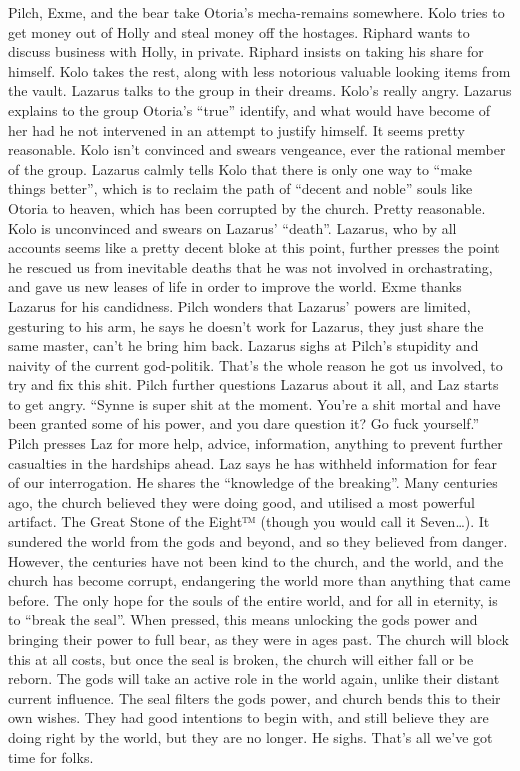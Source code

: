 Pilch, Exme, and the bear take Otoria’s mecha-remains somewhere.\medskip
Kolo tries to get money out of Holly and steal money off the hostages. Riphard wants to discuss business with Holly, in private. Riphard insists on taking his share for himself. Kolo takes the rest, along with less notorious valuable looking items from the vault.\medskip
Lazarus talks to the group in their dreams. Kolo’s really angry. Lazarus explains to the group Otoria’s “true” identify, and what would have become of her had he not intervened in an attempt to justify himself. It seems pretty reasonable. Kolo isn’t convinced and swears vengeance, ever the rational member of the group. Lazarus calmly tells Kolo that there is only one way to “make things better”, which is to reclaim the path of “decent and noble” souls like Otoria to heaven, which has been corrupted by the church. Pretty reasonable. Kolo is unconvinced and swears on Lazarus’ “death”. Lazarus, who by all accounts seems like a pretty decent bloke at this point, further presses the point he rescued us from inevitable deaths that he was not involved in orchastrating, and gave us new leases of life in order to improve the world. Exme thanks Lazarus for his candidness.\medskip
Pilch wonders that Lazarus’ powers are limited, gesturing to his arm, he says he doesn’t work for Lazarus, they just share the same master, can’t he bring him back. Lazarus sighs at Pilch’s stupidity and naivity of the current god-politik. That’s the whole reason he got us involved, to try and fix this shit. Pilch further questions Lazarus about it all, and Laz starts to get angry. “Synne is super shit at the moment. You’re a shit mortal and have been granted some of his power, and you dare question it? Go fuck yourself.” Pilch presses Laz for more help, advice, information, anything to prevent further casualties in the hardships ahead. Laz says he has withheld information for fear of our interrogation. He shares the “knowledge of the breaking”.\medskip
Many centuries ago, the church believed they were doing good, and utilised a most powerful artifact. The Great Stone of the Eight™ (though you would call it Seven…). It sundered the world from the gods and beyond, and so they believed from danger. However, the centuries have not been kind to the church, and the world, and the church has become corrupt, endangering the world more than anything that came before. The only hope for the souls of the entire world, and for all in eternity, is to “break the seal”. When pressed, this means unlocking the gods power and bringing their power to full bear, as they were in ages past. The church will block this at all costs, but once the seal is broken, the church will either fall or be reborn. The gods will take an active role in the world again, unlike their distant current influence. The seal filters the gods power, and church bends this to their own wishes. They had good intentions to begin with, and still believe they are doing right by the world, but they are no longer. He sighs. That’s all we’ve got time for folks.\medskip
